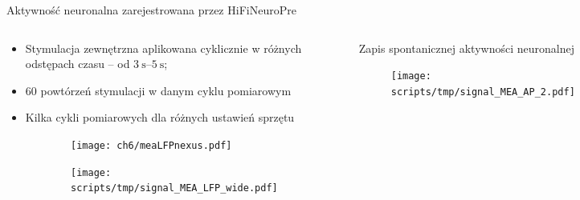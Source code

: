 \begin{frame}{Aktywność neuronalna zarejestrowana przez HiFiNeuroPre}
    \begin{columns}

        \vspace{-1em}

        \begin{block}{}
            {\renewcommand\normalsize{\small}%
            \normalsize
            \begin{itemize}
                \item Stymulacja zewnętrzna  aplikowana cyklicznie w różnych odstępach czasu -- od $\SIrange{3}{5}{\second}$;
                \item 60 powtórzeń stymulacji w danym cyklu pomiarowym 
                \item Kilka cykli pomiarowych dla różnych ustawień sprzętu
    
            \end{itemize}
            }
            \vspace{-1em}
        \begin{figure}[H]
        
        
            \begin{subfigure}{0.25\textwidth}
                \texttt{[image: ch6/meaLFPnexus.pdf]}
             \end{subfigure}
                \hspace{-2em}
             \begin{subfigure}{0.7\textwidth}
                \texttt{[image: scripts/tmp/signal\_MEA\_LFP\_wide.pdf]}
             \end{subfigure}
        \end{figure}
        \end{block}
        \vspace{-1em}

        \begin{block}{Zapis spontanicznej aktywności neuronalnej}
            \begin{figure}[H]
                \centering
                \texttt{[image: scripts/tmp/signal\_MEA\_AP\_2.pdf]}
        \end{figure}
        \end{block}


\end{columns}
\end{frame}
